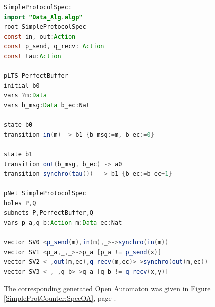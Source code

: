 \documentclass{elsarticle}
\begin{document}
\begin{lstlisting}[basicstyle=\scriptsize\ttfamily, language=java, frame=single]
SimpleProtocolSpec:
import "Data_Alg.algp"
root SimpleProtocolSpec
const in, out:Action
const p_send, q_recv: Action
const tau:Action

pLTS PerfectBuffer
initial b0 
vars ?m:Data
vars b_msg:Data b_ec:Nat

state b0
transition in(m) -> b1 {b_msg:=m, b_ec:=0}

state b1
transition out(b_msg, b_ec) -> a0
transition synchro(tau())  -> b1 {b_ec:=b_ec+1}

pNet SimpleProtocolSpec
holes P,Q
subnets P,PerfectBuffer,Q
vars p_a,q_b:Action m:Data ec:Nat

vector SV0 <p_send(m),in(m),_>->synchro(in(m))
vector SV1 <p_a,_,_>->p_a [p_a != p_send(x)]
vector SV2 <_,out(m,ec),q_recv(m,ec)>->synchro(out(m,ec))
vector SV3 <_,_,q_b>->q_a [q_b != q_recv(x,y)]

  \end{lstlisting}




\bigskip
The corresponding generated Open Automaton was given in Figure \ref{SimpleProtCounter:SpecOA},
page \pageref{SimpleProtCounter:SpecOA}.\\
\end{document}
